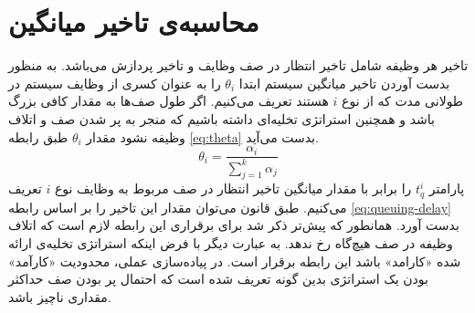 \section{محاسبه‌ی تاخیر میانگین}
تاخیر هر وظیفه شامل تاخیر انتظار در صف وظایف و تاخیر پردازش می‌باشد. به منظور بدست آوردن تاخیر میانگین سیستم ابتدا $\theta_i$ را به عنوان کسری از وظایف سیستم در طولانی مدت که از نوع $i$ هستند تعریف می‌کنیم. اگر طول صف‌ها به مقدار کافی بزرگ باشد و همچنین استراتژی تخلیه‌ای داشته باشیم که منجر به پر شدن صف و اتلاف وظیفه نشود مقدار $\theta_i$ طبق رابطه \ref{eq:theta} بدست می‌آید.
\begin{equation}
\label{eq:theta}
\theta_i = \frac{\alpha_i}{\sum_{j=1}^{k} \alpha_{j}}
\end{equation}
\newpage
پارامتر \(t_q^i\) را برابر با مقدار میانگین تاخیر انتظار در صف مربوط به وظایف نوع $i$ تعریف می‌کنیم. طبق قانون  می‌توان مقدار این تاخیر را بر اساس رابطه \ref{eq:queuing-delay} بدست آورد. همانطور که پیش‌تر ذکر شد برای برقراری این رابطه لازم است که اتلاف وظیفه در صف هیچ‌گاه رخ ندهد. به عبارت دیگر با فرض اینکه استراتژی تخلیه‌ی ارائه شده «کارامد» باشد این رابطه برقرار است. در پیاده‌سازی عملی، محدودیت «کارآمد» بودن یک استراتژی بدین گونه تعریف شده است که احتمال پر بودن صف حداکثر مقداری ناچیز  باشد.

